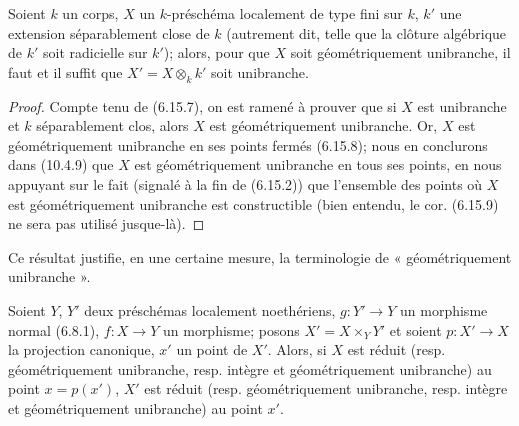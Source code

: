 \begin{corollary}[6.15.9]
\label{IV.2.s6.15.9-fr}
Soient $k$ un corps, $X$ un $k$-préschéma localement de type fini sur $k$,
$k'$ une extension séparablement close de $k$ \textup{(autrement dit, telle que la
clôture algébrique de $k'$ soit radicielle sur $k'$)}; alors, pour que $X$
soit géométriquement unibranche, il faut et il suffit que
$X'=X\otimes_k k'$ soit unibranche.
\end{corollary}

\begin{proof}
Compte tenu de (6.15.7), on est ramené à prouver que si $X$ est unibranche
et $k$ séparablement clos, alors $X$ est géométriquement unibranche. Or, $X$
est géométriquement unibranche en ses points fermés (6.15.8); nous en
conclurons dans (10.4.9) que $X$ est géométriquement unibranche en tous ses
points, en nous appuyant sur le fait (signalé à la fin de (6.15.2)) que
l'ensemble des points où $X$ est géométriquement unibranche est
constructible (bien entendu, le cor. (6.15.9) ne sera pas utilisé
jusque-là).
\end{proof}

Ce résultat justifie, en une certaine mesure, la terminologie de
« géométriquement unibranche ».

\begin{proposition}[6.15.10]
\label{IV.2.s6.15.10-fr}
Soient $Y$, $Y'$ deux préschémas localement noethériens, $g:Y'\to Y$ un
morphisme normal \textup{(6.8.1)}, $f:X\to Y$ un morphisme; posons
$X'=X\times_Y Y'$ et soient $p:X'\to X$ la projection canonique, $x'$ un
point de $X'$. Alors, si $X$ est réduit \textup{(resp.} géométriquement unibranche,
\textup{resp.} intègre et géométriquement unibranche\textup{)} au point $x=p(x')$, $X'$ est
réduit \textup{(resp.} géométriquement unibranche, \textup{resp.} intègre et
géométriquement unibranche\textup{)} au point $x'$.
\end{proposition}


